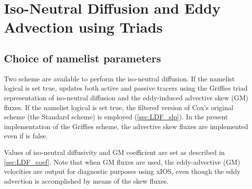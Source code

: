 \documentclass[../main/NEMO_manual]{subfiles}
\begin{document}
\chapter{Iso-Neutral Diffusion and Eddy Advection using Triads}
\label{apdx:triad}

\minitoc

\newpage

\section{Choice of \protect{} namelist parameters}


Two scheme are available to perform the iso-neutral diffusion.
If the namelist logical  is set true,
\NEMO updates both active and passive tracers using the Griffies triad representation of iso-neutral diffusion and
the eddy-induced advective skew (GM) fluxes.
If the namelist logical  is set true,
the filtered version of Cox's original scheme (the Standard scheme) is employed (\autoref{sec:LDF_slp}).
In the present implementation of the Griffies scheme,
the advective skew fluxes are implemented even if  is false.

Values of iso-neutral diffusivity and GM coefficient are set as described in \autoref{sec:LDF_coef}.
Note that when GM fluxes are used, the eddy-advective (GM) velocities are output for diagnostic purposes using xIOS,
even though the eddy advection is accomplished by means of the skew fluxes.
\end{document}
